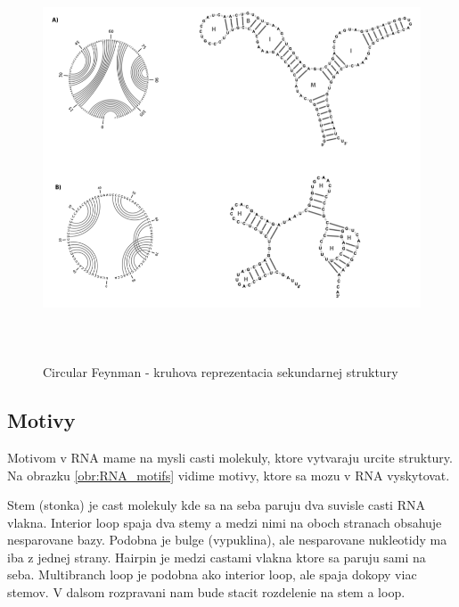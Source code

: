 \begin{figure}[H]
\centering
\includegraphics[width=140mm, height=120mm]{../img/RNA_circular_reprezentation.png}
\caption{Circular Feynman - kruhova reprezentacia sekundarnej struktury}
\label{obr:RNA_circular_representation}
\end{figure}


\subsection{Motivy}

Motivom v RNA mame na mysli casti molekuly, ktore vytvaraju urcite struktury.
Na obrazku \ref{obr:RNA_motifs} vidime motivy, ktore sa mozu v RNA vyskytovat.

Stem (stonka) je cast molekuly kde sa na seba paruju dva suvisle casti RNA vlakna.
Interior loop spaja dva stemy a medzi nimi na oboch stranach obsahuje nesparovane
bazy. Podobna je bulge (vypuklina), ale nesparovane nukleotidy ma iba z jednej strany.
Hairpin je medzi castami vlakna ktore sa paruju sami na seba.
Multibranch loop je podobna ako interior loop, ale spaja dokopy viac stemov.
V dalsom rozpravani nam bude stacit rozdelenie na stem a loop.


